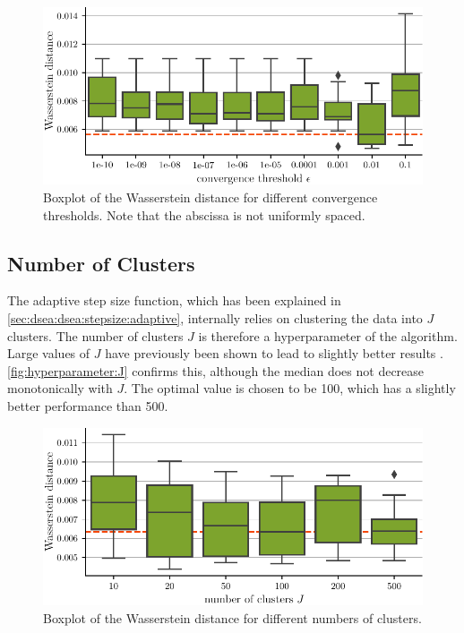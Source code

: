 \begin{figure}
  \centering
  \includegraphics[width=\textwidth]{content/plots/hyperparam/epsilon_vs_wd_boxplot_lessheight.pdf}
  \caption{
    Boxplot of the Wasserstein distance for different convergence thresholds.
    Note that the abscissa is not uniformly spaced.
  }
  \label{fig:hyperparameter:epsilon}
\end{figure}


\subsection{Number of Clusters}
The adaptive step size function,
  which has been explained in \autoref{sec:dsea:dsea:stepsize:adaptive}, %
internally relies on clustering the data into $J$ clusters.
The number of clusters $J$ is therefore a hyperparameter of the algorithm.
%
Large values of $J$ have previously been shown to lead to slightly better results \cite{dsea_mirko}.
\autoref{fig:hyperparameter:J} confirms this,
although the median does not decrease monotonically with $J$.
The optimal value is chosen to be \num{100},
which has a slightly better performance than \num{500}.

\begin{figure}
  \centering
  \includegraphics[scale=1]{content/plots/hyperparam/J_vs_wd_boxplot_lessheight.pdf}
  \caption{Boxplot of the Wasserstein distance for different numbers of clusters.}
  \label{fig:hyperparameter:J}
\end{figure}



